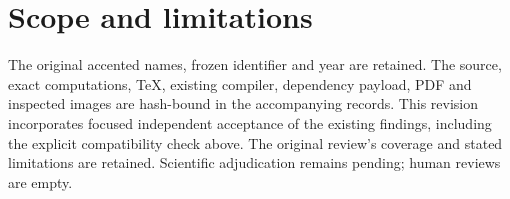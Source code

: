 \documentclass[10pt]{article}
\begin{document}
\section*{Scope and limitations}
The original accented names, frozen identifier and year are retained. The source, exact computations, TeX, existing compiler, dependency payload, PDF and inspected images are hash-bound in the accompanying records. This revision incorporates focused independent acceptance of the existing findings, including the explicit compatibility check above. The original review’s coverage and stated limitations are retained. Scientific adjudication remains pending; human reviews are empty.\par
\end{document}
